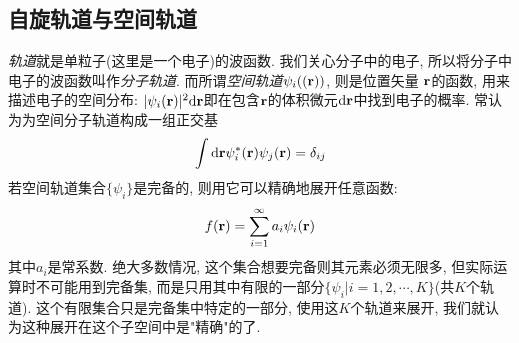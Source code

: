  \subsection{自旋轨道与空间轨道}
 \label{sec2.2.1}
 \emph{轨道}就是单粒子(这里是一个电子)的波函数. 我们关心分子中的电子, 所以将分子中电子的波函数叫作\emph{分子轨道}. 而所谓\emph{空间轨道}$\psi_i(\mathbf{(r)})$, 则是位置矢量 $\mathbf{r}$的函数, 用来描述电子的空间分布: $|\psi_i(\bo{r})|^2\dd \bo{r}$即在包含$\mathbf{r}$的体积微元$\dd\bo{r}$中找到电子的概率. 常认为为空间分子轨道构成一组正交基
 \begin{equation}
 \int\dd\bo{r}\psi_i^*(\bo{r})\psi_j(\bo{r})=\delta_{ij}
 \end{equation}
 若空间轨道集合$\{\psi_i \}$是完备的, 则用它可以精确地展开任意函数:
 \begin{equation}
 f(\mathbf{r})=\sum_{i=1}^{\infty}a_i\psi_i(\mathbf{r})
 \end{equation}
其中$a_i$是常系数. 绝大多数情况, 这个集合想要完备则其元素必须无限多, 但实际运算时不可能用到完备集, 而是只用其中有限的一部分$\{\psi_i|i=1,2,\cdots,K\}$(共$K$个轨道). 这个有限集合只是完备集中特定的一部分, 使用这$K$个轨道来展开, 我们就认为这种展开在这个子空间中是"精确"的了.

